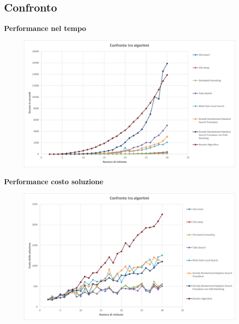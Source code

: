 \documentclass[9pt]{beamer}
\begin{document}
\subsection{Confronto}
\begin{frame}[allowframebreaks]{\subsecname}

	\textbf{Performance nel tempo}
      	\begin{figure}[h]
	\centering
	\includegraphics[width=\textwidth]
	{../charts/20a Confronto tra algoritmi}
	\end{figure}

\framebreak

	\textbf{Performance costo soluzione}
      	\begin{figure}[h]
	\centering
	\includegraphics[width=\textwidth]
	{../charts/20b Confronto tra algoritmi}
	\end{figure}

\framebreak


\end{frame}
\end{document}
